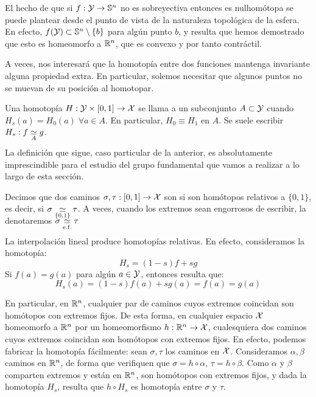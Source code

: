 \begin{obs}
	El hecho de que si $f:\Y\to\Sfe^n$ no es sobreyectiva entonces es nulhomótopa se puede plantear desde el punto de vista de la naturaleza topológica de la esfera. En efecto, $f(\Y)\subset\Sfe^n\setminus\{b\}$ para algún punto $b$, y resulta que hemos demostrado que esto es homeomorfo a $\R^n$, que es convexo y por tanto contráctil.
\end{obs}

A veces, nos interesará que la homotopía entre dos funciones mantenga invariante alguna propiedad extra. En particular, solemos necesitar que algunos puntos no se muevan de su posición al homotopar.
\begin{defi}
	Una homotopía $H:\Y\times[0,1]\to\X$ se llama  a un subconjunto $A\subset\Y$ cuando $H_s(a)=H_0(a)\;\forall a\in A$. En particular, $H_0\equiv H_1$ en $A$. Se suele escribir $H_s:f\homot[A]g$.
\end{defi}

La definición que sigue, caso particular de la anterior, es absolutamente imprescindible para el estudio del grupo fundamental que vamos a realizar a lo largo de esta sección.

\begin{defi}
	Decimos que dos caminos $\sigma,\tau:[0,1]\to\X$ son  si son homótopos relativos a $\{0,1\}$, es decir, si $\sigma\homot[\{0,1\}]\tau$. A veces, cuando los extremos sean engorrosos de escribir, la denotaremos $\sigma\homotef\tau$
\end{defi}

\begin{exa}
	La interpolación lineal produce homotopías relativas. En efecto, consideramos la homotopía:
	\[H_s = (1-s)f + sg\]
	Si $f(a)=g(a)$ para algún $a\in\Y$, entonces resulta que:
	\[H_s(a)=(1-s)f(a)+sg(a)=f(a)=g(a)\]
	
	En particular, en $\R^n$, cualquier par de caminos cuyos extremos coincidan son homótopos con extremos fijos. De esta forma, en cualquier espacio $\X$ homeomorfo a $\R^n$ por un homeomorfismo $h:\R^n\to \X$, cualesquiera dos caminos cuyos extremos coincidan son homótopos con extremos fijos. En efecto, podemos fabricar la homotopía fácilmente: sean $\sigma,\tau$ los caminos en $\X$. Consideramos $\alpha,\beta$ caminos en $\R^n$, de forma que verifiquen que $\sigma = h\circ\alpha$, $\tau = h\circ\beta$. Como $\alpha$ y $\beta$ comparten extremos y están en $\R^n$, son homótopos con extremos fijos, y dada la homotopía $H_s$, resulta que $h\circ H_s$ es homotopía entre $\sigma$ y $\tau$.
\end{exa}

